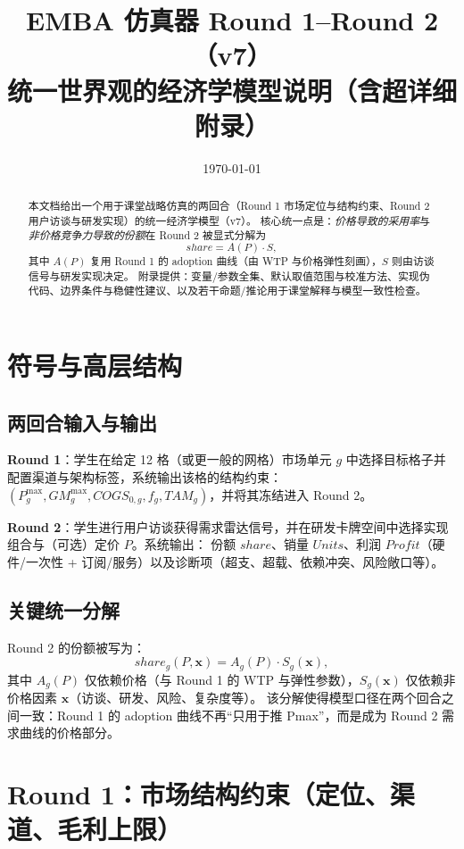 \documentclass[UTF8,12pt]{ctexart}
\title{EMBA 仿真器 Round 1--Round 2（v7）\\统一世界观的经济学模型说明（含超详细附录）}
\author{}
\date{\today}
\begin{document}
\maketitle

\begin{abstract}
本文档给出一个用于课堂战略仿真的两回合（Round 1 市场定位与结构约束、Round 2 用户访谈与研发实现）的统一经济学模型（v7）。
核心统一点是：\emph{价格导致的采用率}与\emph{非价格竞争力导致的份额}在 Round 2 被显式分解为
\[
share = A(P)\cdot S,
\]
其中 $A(P)$ 复用 Round 1 的 adoption 曲线（由 WTP 与价格弹性刻画），$S$ 则由访谈信号与研发实现决定。
附录提供：变量/参数全集、默认取值范围与校准方法、实现伪代码、边界条件与稳健性建议、以及若干命题/推论用于课堂解释与模型一致性检查。
\end{abstract}

\clearpage
\setcounter{tocdepth}{2}
\tableofcontents
\clearpage

\section{符号与高层结构}

\subsection{两回合输入与输出}
\textbf{Round 1}：学生在给定 12 格（或更一般的网格）市场单元 $g$ 中选择目标格子并配置渠道与架构标签，系统输出该格的结构约束：
$(P^{\max}_g, GM^{\max}_g, COGS_{0,g}, f_g, TAM_g)$，并将其冻结进入 Round 2。

\textbf{Round 2}：学生进行用户访谈获得需求雷达信号，并在研发卡牌空间中选择实现组合与（可选）定价 $P$。系统输出：
份额 $share$、销量 $Units$、利润 $Profit$（硬件/一次性 + 订阅/服务）以及诊断项（超支、超载、依赖冲突、风险敞口等）。

\subsection{关键统一分解}
Round 2 的份额被写为：
\begin{equation}
share_g(P,\mathbf{x}) = A_g(P)\cdot S_g(\mathbf{x}),
\end{equation}
其中 $A_g(P)$ 仅依赖价格（与 Round 1 的 WTP 与弹性参数），$S_g(\mathbf{x})$ 仅依赖非价格因素 $\mathbf{x}$（访谈、研发、风险、复杂度等）。
该分解使得模型口径在两个回合之间一致：Round 1 的 adoption 曲线不再“只用于推 Pmax”，而是成为 Round 2 需求曲线的价格部分。

\section{Round 1：市场结构约束（定位、渠道、毛利上限）}
\end{document}
